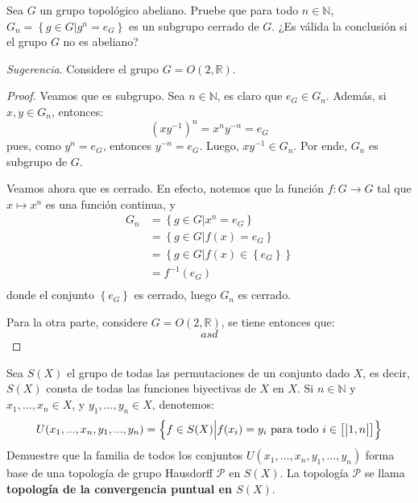\documentclass[12pt]{report}
\theoremstyle{largebreak}
\newcommand{\cf}[3]{\ensuremath{#1:#2\rightarrow#3}}
\newcommand{\natint}[1]{\ensuremath{\left[\big|#1\big|\right]}}
\begin{document}
    \begin{excer}
        Sea $G$ un grupo topológico abeliano. Pruebe que para todo $n\in\mathbb{N}$, $G_n=\left\{g\in G\Big|g^n=e_G \right\}$ es un subgrupo cerrado de $G$. ¿Es válida la conclusión si el grupo $G$ no es abeliano?

        \textit{Sugerencia}. Considere el grupo $G=O(2,\mathbb{R})$.
    \end{excer}

    \begin{proof}
        Veamos que es subgrupo. Sea $n\in\mathbb{N}$, es claro que $e_G\in G_n$. Además, si $x,y\in G_n$, entonces:
        \begin{equation*}
            \left(xy^{-1}\right)^n=x^ny^{-n}=e_G
        \end{equation*}
        pues, como $y^n=e_G$, entonces $y^{-n}=e_G$. Luego, $xy^{-1}\in G_n$. Por ende, $G_n$ es subgrupo de $G$.

        Veamos ahora que es cerrado. En efecto, notemos que la función $\cf{f}{G}{G}$ tal que $x\mapsto x^n$ es una función continua, y
        \begin{equation*}
            \begin{split}
                G_n&=\left\{g\in G\Big| x^n=e_G \right\}\\
                &=\left\{g\in G\Big| f(x)=e_G \right\}\\
                &=\left\{g\in G\Big| f(x)\in\left\{e_G\right\} \right\}\\
                &=f^{-1}(e_G)\\
            \end{split}
        \end{equation*}
        donde el conjunto $\left\{e_G\right\}$ es cerrado, luego $G_n$ es cerrado.

        Para la otra parte, considere $G=O(2,\mathbb{R})$, se tiene entonces que:
        \begin{equation*}
            asd
        \end{equation*} 
    \end{proof}

    \begin{excer}
        Sea $S(X)$ el grupo de todas las permutaciones de un conjunto dado $X$, es decir, $S(X)$ consta de todas las funciones biyectivas de $X$ en $X$. Si $n\in\mathbb{N}$ y $x_1,...,x_n\in X$, y $y_1,...,y_n\in X$, denotemos:
        \begin{equation*}
            U(x_1,...,x_n,y_1,...,y_n)=\left\{f\in S(X)\Big| f(x_i)=y_i\textup{ para todo }i\in\natint{1,n} \right\}
        \end{equation*}
        Demuestre que la familia de todos los conjuntos $U(x_1,...,x_n,y_1,...,y_n)$ forma base de una topología de grupo Hausdorff $\mathcal{P}$ en $S(X)$. La topología $\mathcal{P}$ se llama \textbf{topología de la convergencia puntual en $S(X)$}.
    \end{excer}
\end{document}
